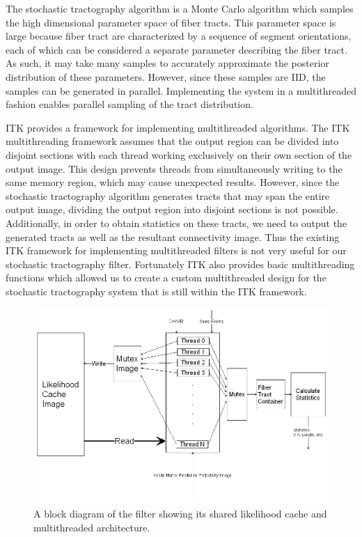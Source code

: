 \documentclass{InsightArticle}
\begin{document}
The stochastic tractography algorithm is a Monte Carlo algorithm which samples the high dimensional parameter space of fiber tracts.  This parameter space is large because fiber tract are characterized by a sequence of segment orientations, each of which can be considered a separate parameter describing the fiber tract.  As such, it may take many samples to accurately approximate the posterior distribution of these parameters.  However, since these samples are IID, the samples can be generated in parallel.  Implementing the system in a multithreaded fashion enables parallel sampling of the tract distribution.

ITK  provides a framework for implementing multithreaded algorithms.  The ITK multithreading framework assumes that the output region can be divided into disjoint sections with each thread working exclusively on their own section of the output image.  This design prevents threads from simultaneously writing to the same memory region, which may cause unexpected results.  However, since the stochastic tractography algorithm generates tracts that may span the entire output image, dividing the output region into disjoint sections is not possible.  Additionally, in order to obtain statistics on these tracts, we need to output the generated tracts as well as the resultant connectivity image.  Thus the existing ITK framework for implementing multithreaded filters is not very useful for our stochastic tractography filter.  Fortunately ITK also provides basic multithreading functions which allowed us to create a custom multithreaded design for the stochastic tractography system that is still within the ITK framework. 

\begin{figure}[t]
  \center
	\includegraphics[width=\linewidth]{filterblock}
	\caption{A block diagram of the filter showing its shared likelihood cache and multithreaded architecture.}
	\label{fig:filterblock}
\end{figure}
\end{document}
